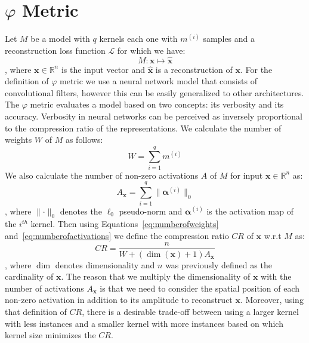 \documentclass[journal]{IEEEtran}
\begin{document}
\section{$\varphi$ Metric}\label{sec:flithos}
Let $M$ be a model with $q$ kernels each one with $m^{(i)}$ samples
and a reconstruction loss function $\mathcal{L}$ for which we have:
\begin{equation}
  \label{eq:model}
  M: \bm{x} \longmapsto \hat{\bm{x}}
\end{equation}
\noindent
, where $\bm{x} \in \mathbb{R}^n$ is the input vector and
$\hat{\bm{x}}$ is a reconstruction of $\bm{x}$.
For the definition of $\varphi$ metric we use a neural network model
that consists of convolutional filters, however this can be easily
generalized to other architectures.
The $\varphi$ metric evaluates a model based on two concepts: its
verbosity and its accuracy.
Verbosity in neural networks can be perceived as inversely
proportional to the compression ratio of the representations.
We calculate the number of weights $W$ of $M$ as follows:
\begin{equation}
  \label{eq:numberofweights}
  W = \sum\limits_{i=1}^q m^{(i)}
\end{equation}
We also calculate the number of non-zero activations $A$ of $M$ for
input $\bm{x} \in \mathbb{R}^n$ as:
\begin{equation}
  \label{eq:numberofactivations}
  A_{\bm{x}} = \sum\limits_{i=1}^q \Big\lVert\bm{\alpha}^{(i)}\Big\rVert_0
\end{equation}
\noindent
, where $\lVert \cdot \rVert_0$ denotes the $\ell_0$ pseudo-norm and
$\bm{\alpha}^{(i)}$ is the activation map of the $i^{th}$ kernel.
Then using Equations~\ref{eq:numberofweights}
and~\ref{eq:numberofactivations} we define the compression ratio $CR$
of $\bm{x}$ w.r.t $M$ as:
\begin{equation}
  \label{eq:compressionratio}
  CR = \frac{n}{W + (\dim(\bm{x}) + 1)A_{\bm{x}}}
\end{equation}
\noindent
, where $\dim$ denotes dimensionality and $n$ was previously defined
as the cardinality of $\bm{x}$.
The reason that we multiply the dimensionality of $\bm{x}$ with the
number of activations $A_{\bm{x}}$ is that we need to consider the
spatial position of each non-zero activation in addition to its
amplitude to reconstruct $\bm{x}$.
Moreover, using that definition of $CR$, there is a desirable
trade-off between using a larger kernel with less instances and a
smaller kernel with more instances based on which kernel size
minimizes the $CR$.
\end{document}
